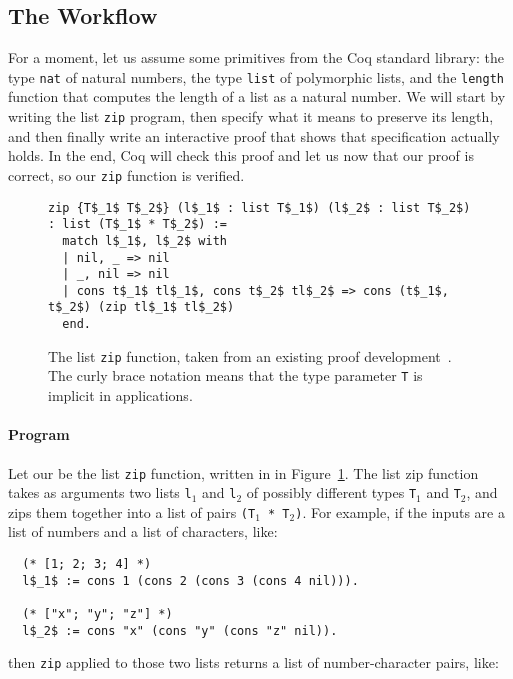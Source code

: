 \subsection{The Workflow}
\label{sec:mot-workflow}

For a moment, let us assume some primitives from the Coq standard library: the type \lstinline{nat} of natural numbers,
the type \lstinline{list} of polymorphic lists, and the \lstinline{length} function that computes the length of a list as a natural number.
We will start by writing the list \lstinline{zip} program, then specify what it means to preserve its length, and then finally
write an interactive proof that shows that specification actually holds.
In the end, Coq will check this proof and let us now that our proof is correct, so our \lstinline{zip} function is verified.

\begin{figure}
\begin{lstlisting}
zip {T$_1$ T$_2$} (l$_1$ : list T$_1$) (l$_2$ : list T$_2$) : list (T$_1$ * T$_2$) :=
  match l$_1$, l$_2$ with
  | nil, _ => nil
  | _, nil => nil
  | cons t$_1$ tl$_1$, cons t$_2$ tl$_2$ => cons (t$_1$, t$_2$) (zip tl$_1$ tl$_2$)
  end.
\end{lstlisting}
\caption{The list \lstinline{zip} function, taken from an existing proof development~\cite{hstocoqv}. The curly brace notation means that the type parameter \lstinline{T} is implicit in applications.}
\label{fig:zip}
\end{figure}

\paragraph{Program} Let our  be the list \lstinline{zip} function, written in  in Figure~\ref{fig:zip}.
The list zip function takes as arguments two lists \lstinline{l}$_1$ and \lstinline{l}$_2$ of possibly different types \lstinline{T}$_1$ and \lstinline{T}$_2$, and zips them together into
a list of pairs \lstinline{(T}$_1$\lstinline{ * T}$_2$\lstinline{)}.
For example, if the inputs are a list of numbers and a list of characters, like:

\begin{lstlisting}
  (* [1; 2; 3; 4] *)
  l$_1$ := cons 1 (cons 2 (cons 3 (cons 4 nil))).

  (* ["x"; "y"; "z"] *)
  l$_2$ := cons "x" (cons "y" (cons "z" nil)).
\end{lstlisting}
then \lstinline{zip} applied to those two lists returns a list of number-character pairs, like:


